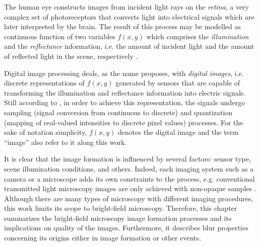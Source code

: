 











The human eye constructs images from incident light rays on the \emph{retina}, a very complex set of photoreceptors that converts light into electrical signals which are later interpreted by the brain. The result of this process may be modelled as continuous function of two variables $f(x,y)$ which comprises the \emph{illumination} and the \emph{reflectance} information, i.e. the amount of incident light and the amount of reflected light in the scene, respectively \cite{gonzalez2018digital}.

Digital image processing deals, as the name proposes, with \emph{digital images}, i.e. discrete representations of $f(x,y)$ generated by sensors that are capable of transforming the illumination and reflectance information into electric signals. Still according to , in order to achieve this representation, the signals undergo sampling (signal conversion from continuous to discrete) and quantization (mapping of real-valued intensities to discrete pixel values) processes. For the sake of notation simplicity, $f(x,y)$ denotes the digital image and the term ``image'' also refer to it along this work.

It is clear that the image formation is influenced by several factors: sensor type, scene illumination conditions, and others. Indeed, each imaging system such as a camera or a microscope adds its own constraints to the process, e.g. conventional transmitted light microscopy images are only achieved with non-opaque samples \cite{rudi2020contrast}. Although there are many types of microscopy with different imaging procedures, this work limits its scope to bright-field microscopy. Therefore, this chapter summarizes the bright-field microscopy image formation processes and its implications on quality of the images. Furthermore, it describes blur properties concerning its origins either in image formation or other events. 



